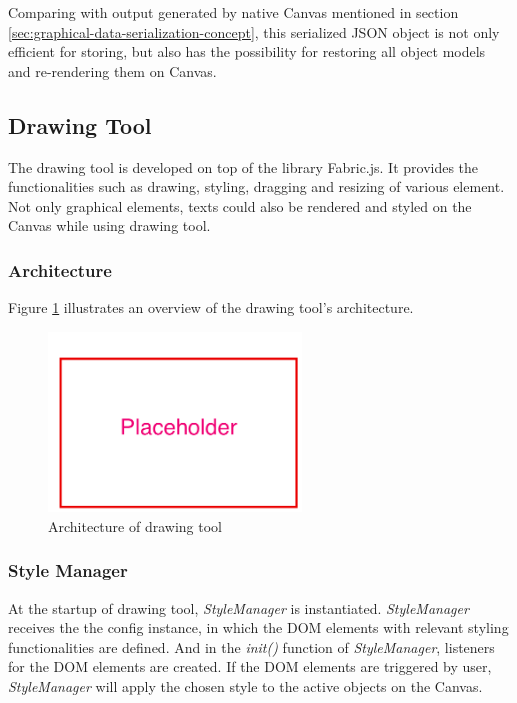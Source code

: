 Comparing with output generated by native Canvas mentioned in section \ref{sec:graphical-data-serialization-concept}, this serialized JSON object is not only efficient for storing, but also has the possibility for restoring all object models and re-rendering them on Canvas.

\subsection{Drawing Tool}
The drawing tool is developed on top of the library Fabric.js. It provides the functionalities such as drawing, styling, dragging and resizing of various element. Not only graphical elements, texts could also be rendered and styled on the Canvas while using drawing tool.

\subsubsection{Architecture}


Figure \ref{fig:drawing-tool-arc-imp} illustrates an overview of the drawing tool's architecture. 

\begin{figure}[!htbp]
  \centering
    \includegraphics[width=0.6\textwidth]{Figures/placeholder.png}
  \caption{Architecture of drawing tool}
  \label{fig:drawing-tool-arc-imp}
\end{figure}

\subsubsection{Style Manager}
At the startup of drawing tool, \textit{StyleManager} is instantiated. \textit{StyleManager} receives the the config instance, in which the DOM elements with relevant styling functionalities are defined. And in the \textit{init()} function of \textit{StyleManager}, listeners for the DOM elements are created. If the DOM elements are triggered by user, \textit{StyleManager} will apply the chosen style to the active objects on the Canvas.

